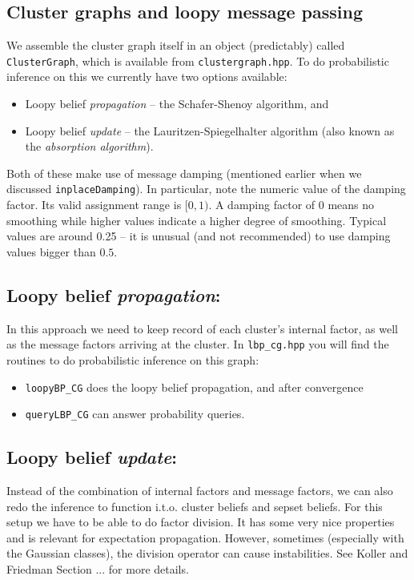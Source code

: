 \documentclass[english]{article}
\begin{document}
\subsection{Cluster graphs and loopy message passing}

We assemble the cluster graph itself in an object (predictably) called
\texttt{ClusterGraph}, which is available from
\texttt{clustergraph.hpp}.  To do probabilistic inference on this we
currently have two options available:
\begin{itemize}
  \item Loopy belief \emph{propagation} -- the Schafer-Shenoy
    algorithm, and
  \item Loopy belief \emph{update} -- the Lauritzen-Spiegelhalter
    algorithm (also known as the \emph{absorption algorithm}).
\end{itemize}

Both of these make use of message damping (mentioned earlier when we
discussed \texttt{inplaceDamping}). In particular, note the numeric value
of the damping factor.  Its valid assignment range is $[0,1)$. A
damping factor of $0$ means no smoothing while higher values
indicate a higher degree of smoothing. Typical values are around
0.25 -- it is unusual (and not recommended) to use damping values
bigger than $0.5$.

\subsection{Loopy belief \emph{propagation}:}
In this approach we need to keep record of each cluster's internal
factor, as well as the message factors arriving at the cluster. In
\texttt{lbp\_cg.hpp} you will find the routines to do probabilistic
inference on this graph:
\begin{itemize}
\item \texttt{loopyBP\_CG} does the loopy belief propagation, and
  after convergence
\item \texttt{queryLBP\_CG} can answer probability queries.
\end{itemize}

\subsection{Loopy belief \emph{update}:}
Instead of the combination of internal factors and message factors, we
can also redo the inference to function i.t.o. cluster beliefs and
sepset beliefs. For this setup we have to be able to do factor
division. It has some very nice properties and is relevant for
expectation propagation. However, sometimes (especially with the
Gaussian classes), the division operator can cause instabilities. See
Koller and Friedman Section ... for more details.
\end{document}
